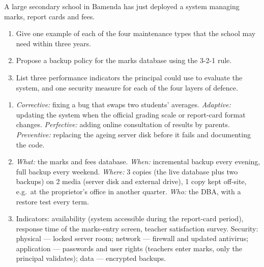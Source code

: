 \documentclass[11pt]{article}
\begin{document}
\begin{exercice}
A large secondary school in Bamenda has just deployed a system managing marks, report cards and fees.
\begin{enumerate}
\item Give one example of each of the four maintenance types that the school may need within three years.
\item Propose a backup policy for the marks database using the 3-2-1 rule.
\item List three performance indicators the principal could use to evaluate the system, and one security measure for each of the four layers of defence.
\end{enumerate}
\end{exercice}

\begin{corrige}[Exercise 1]
\begin{enumerate}
\item \emph{Corrective:} fixing a bug that swaps two students' averages. \emph{Adaptive:} updating the system when the official grading scale or report-card format changes. \emph{Perfective:} adding online consultation of results by parents. \emph{Preventive:} replacing the ageing server disk before it fails and documenting the code.
\item \emph{What:} the marks and fees database. \emph{When:} incremental backup every evening, full backup every weekend. \emph{Where:} 3 copies (the live database plus two backups) on 2 media (server disk and external drive), 1 copy kept off-site, e.g.\ at the proprietor's office in another quarter. \emph{Who:} the DBA, with a restore test every term.
\item Indicators: availability (system accessible during the report-card period), response time of the marks-entry screen, teacher satisfaction survey. Security: physical — locked server room; network — firewall and updated antivirus; application — passwords and user rights (teachers enter marks, only the principal validates); data — encrypted backups.
\end{enumerate}
\end{corrige}
\end{document}
